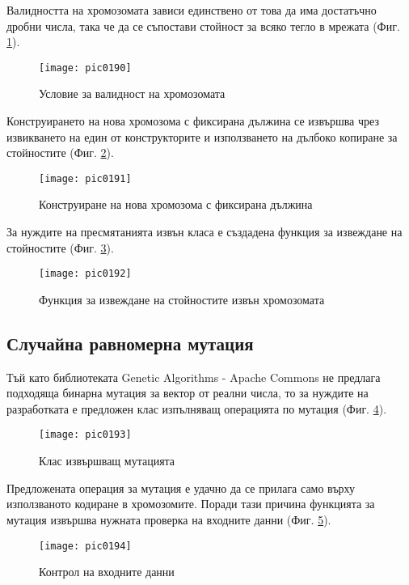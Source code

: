 Валидността на хромозомата зависи единствено от това да има достатъчно дробни числа, така че да се съпостави стойност за всяко тегло в мрежата (Фиг. \ref{fig:pic0190}).

\begin{figure}[h]
  \centering
  \texttt{[image: pic0190]}
  \caption{Условие за валидност на хромозомата}
\label{fig:pic0190}
\end{figure}
\FloatBarrier

Конструирането на нова хромозома с фиксирана дължина се извършва чрез извикването на един от конструкторите и използването на дълбоко копиране за стойностите (Фиг. \ref{fig:pic0191}).

\begin{figure}[h]
  \centering
  \texttt{[image: pic0191]}
  \caption{Конструиране на нова хромозома с фиксирана дължина}
\label{fig:pic0191}
\end{figure}
\FloatBarrier

За нуждите на пресмятанията извън класа е създадена функция за извеждане на стойностите (Фиг. \ref{fig:pic0192}).

\begin{figure}[h]
  \centering
  \texttt{[image: pic0192]}
  \caption{Функция за извеждане на стойностите извън хромозомата}
\label{fig:pic0192}
\end{figure}
\FloatBarrier

\subsection{Случайна равномерна мутация}

Тъй като библиотеката Genetic Algorithms - Apache Commons не предлага подходяща бинарна мутация за вектор от реални числа, то за нуждите на разработката е предложен клас изпълняващ операцията по мутация (Фиг. \ref{fig:pic0193}).

\begin{figure}[h]
  \centering
  \texttt{[image: pic0193]}
  \caption{Клас извършващ мутацията}
\label{fig:pic0193}
\end{figure}
\FloatBarrier

Предложената операция за мутация е удачно да се прилага само върху използваното кодиране в хромозомите. Поради тази причина функцията за мутация извършва нужната проверка на входните данни (Фиг. \ref{fig:pic0194}).

\begin{figure}[h]
  \centering
  \texttt{[image: pic0194]}
  \caption{Контрол на входните данни}
\label{fig:pic0194}
\end{figure}
\FloatBarrier

